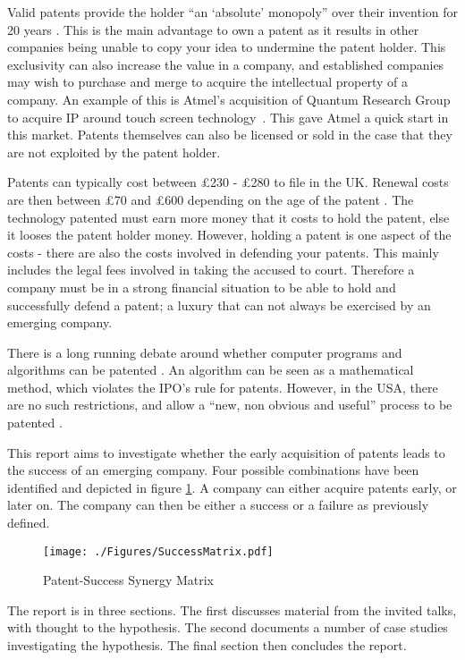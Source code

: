 
Valid patents provide the holder ``an `absolute' monopoly'' over their invention for 20 years \cite{waelde2013contemporary}.
This is the main advantage to own a patent as it results in other companies being unable to copy your idea to undermine the patent holder.
This exclusivity can also increase the value in a company, and established companies may wish to purchase and merge to acquire the intellectual property of a company.
An example of this is Atmel's acquisition of Quantum Research Group to acquire IP around touch screen technology~\cite{atmel:acq:qrg08}.
This gave Atmel a quick start in this market. %
Patents themselves can also be licensed or sold in the case that they are not exploited by the patent holder. 

Patents can typically cost between \pounds 230 - \pounds 280 to file in the UK. 
Renewal costs are then between \pounds 70 and \pounds 600 depending on the age of the patent \cite{ipocosts}.
The technology patented must earn more money that it costs to hold the patent, else it looses the patent holder money.
However, holding a patent is one aspect of the costs - there are also the costs involved in defending your patents.
This mainly includes the legal fees involved in taking the accused to court. 
Therefore a company must be in a strong financial situation to be able to hold and successfully defend a patent; a luxury that can not always be exercised by an emerging company.


There is a long running debate around whether computer programs and algorithms can be patented \cite{juden2005can, klemens2005math}.
An algorithm can be seen as a mathematical method, which violates the IPO's rule for patents.
However, in the USA, there are no such restrictions, and allow a ``new, non obvious and useful'' process to be patented \cite{usapatent}.

This report aims to investigate whether the early acquisition of patents leads to the success of an emerging company.
Four possible combinations have been identified and depicted in figure \ref{fig:synergymatrix}. 
A company can either acquire patents early, or later on. 
The company can then be either a success or a failure as previously defined.

\begin{figure}
\centering
\texttt{[image: ./Figures/SuccessMatrix.pdf]}
\caption{Patent-Success Synergy Matrix} %
\label{fig:synergymatrix}
\end{figure}

The report is in three sections. 
The first discusses material from the invited talks, with thought to the hypothesis.
The second documents a number of case studies investigating the hypothesis.
The final section then concludes the report.
